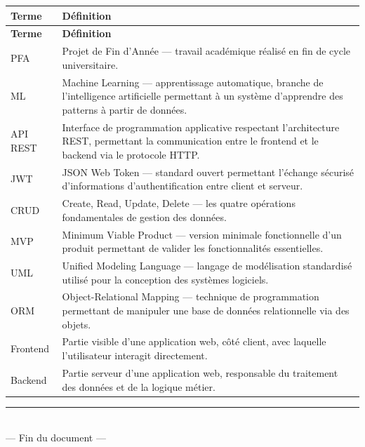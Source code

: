 \documentclass[12pt,a4paper]{report}
\begin{document}
\begin{longtable}{|l|p{10cm}|}
\hline
\textbf{Terme} & \textbf{Définition} \\
\hline
\endfirsthead
\hline
\textbf{Terme} & \textbf{Définition} \\
\hline
\endhead
PFA & Projet de Fin d'Année --- travail académique réalisé en fin de cycle
      universitaire. \\
\hline
ML & Machine Learning --- apprentissage automatique, branche de l'intelligence
     artificielle permettant à un système d'apprendre des patterns à partir
     de données. \\
\hline
API REST & Interface de programmation applicative respectant l'architecture
           REST, permettant la communication entre le frontend et le backend
           via le protocole HTTP. \\
\hline
JWT & JSON Web Token --- standard ouvert permettant l'échange sécurisé
      d'informations d'authentification entre client et serveur. \\
\hline
CRUD & Create, Read, Update, Delete --- les quatre opérations fondamentales de
       gestion des données. \\
\hline
MVP & Minimum Viable Product --- version minimale fonctionnelle d'un produit
      permettant de valider les fonctionnalités essentielles. \\
\hline
UML & Unified Modeling Language --- langage de modélisation standardisé utilisé
      pour la conception des systèmes logiciels. \\
\hline
ORM & Object-Relational Mapping --- technique de programmation permettant de
      manipuler une base de données relationnelle via des objets. \\
\hline
Frontend & Partie visible d'une application web, côté client, avec laquelle
           l'utilisateur interagit directement. \\
\hline
Backend & Partie serveur d'une application web, responsable du traitement des
          données et de la logique métier. \\
\hline
\end{longtable}

\vfill
\begin{center}
  \rule{0.5\textwidth}{0.5pt}\\[6pt]
  {\large --- Fin du document ---}
\end{center}
\end{document}
